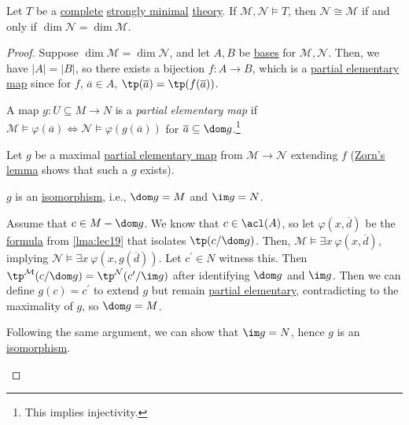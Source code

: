 \begin{theorem}
	Let \(T\) be a \hyperref[def:theory-complete]{complete} \hyperref[def:strongly-minimal]{strongly minimal} \hyperref[def:theory]{theory}. If \(\mathcal{M} , \mathcal{N} \models T\), then \(\mathcal{N} \cong \mathcal{M} \) if and only if \(\dim \mathcal{N} = \dim \mathcal{M} \).
\end{theorem}
\begin{proof}
	Suppose \(\dim \mathcal{M} = \dim \mathcal{N} \), and let \(A, B\) be \hyperref[not:basis]{bases} for \(\mathcal{M} , \mathcal{N} \). Then, we have \(\vert A \vert = \vert B \vert \), so there exists a bijection \(f\colon A \to B\), which is a \hyperref[not:partial-elementary-map]{partial elementary map} since for \(f\), \(\overline{a} \in A\), \(\tp(\overline{a} ) = \tp(f(\overline{a} ))\).

	\begin{notation}\label{not:partial-elementary-map}
		A map \(g \colon U \subseteq M \to N\) is a \emph{partial elementary map} if \(\mathcal{M} \models \varphi (\overline{a} ) \iff \mathcal{N} \models \varphi (g(\overline{a} ))\) for \(\overline{a} \subseteq \dom g\).\footnote{This implies injectivity.}
	\end{notation}

	Let \(g\) be a maximal \hyperref[not:partial-elementary-map]{partial elementary map} from \(\mathcal{M} \to  \mathcal{N} \) extending \(f\) (\hyperref[thm:Zorn]{Zorn's lemma} shows that such a \(g\) exists).

	\begin{claim}
		\(g\) is an \hyperref[def:isomorphism]{isomorphism}, i.e., \(\dom g = M \) and \(\im g = N\).
	\end{claim}
	\begin{explanation}
		Assume that \(c \in M - \dom g\). We know that \(c\in \acl(A)\), so let \(\varphi (x, \overline{d} )\) be the \hyperref[def:formula]{formula} from \autoref{lma:lec19} that isolates \(\tp(c / \dom g)\). Then, \(\mathcal{M} \models \exists x\ \varphi (x, \overline{d} )\), implying \(\mathcal{N} \models \exists x\ \varphi (x, g(\overline{d} ))\). Let \(c^{\prime} \in N\) witness this. Then \(\tp^{\mathcal{M} } (c / \dom g) = \tp^{\mathcal{N} } (c^{\prime} / \im g)\) after identifying \(\dom g\) and \(\im g\). Then we can define \(g(c) = c^{\prime} \) to extend \(g\) but remain \hyperref[not:partial-elementary-map]{partial elementary}, contradicting to the maximality of \(g\), so \(\dom g = M\).

		Following the same argument, we can show that \(\im g = N\), hence \(g\) is an \hyperref[def:isomorphism]{isomorphism}.
	\end{explanation}
\end{proof}